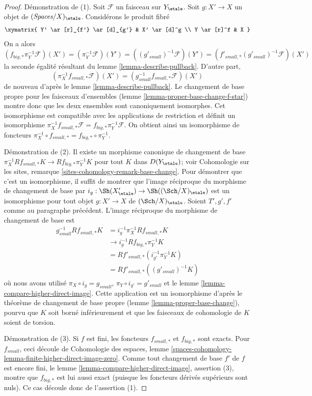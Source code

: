 \begin{proof}
Démonstration de (1). Soit $\mathcal{F}$ un faisceau sur $Y_\etale$.
Soit $g : X' \to X$ un objet de $(\textit{Spaces}/X)_\etale$.
Considérons le produit fibré
$$
\xymatrix{
Y' \ar[r]_{f'} \ar[d]_{g'} & X' \ar[d]^g \\
Y \ar[r]^f & X
}
$$
On a alors
$$
(f_{big, *}\pi_Y^{-1}\mathcal{F})(X') =
(\pi_Y^{-1}\mathcal{F})(Y') =
((g'_{small})^{-1}\mathcal{F})(Y')  =
(f'_{small, *}(g'_{small})^{-1}\mathcal{F})(X')
$$
la seconde égalité résultant du lemme \ref{lemma-describe-pullback}.
D'autre part,
$$
(\pi_X^{-1}f_{small, *}\mathcal{F})(X') =
(g_{small}^{-1}f_{small, *}\mathcal{F})(X')
$$
de nouveau d'après le lemme \ref{lemma-describe-pullback}.
Le changement de base propre pour les faisceaux d'ensembles
(lemme \ref{lemma-proper-base-change-f-star}) montre donc que les deux
ensembles sont canoniquement isomorphes. Cet isomorphisme est compatible
avec les applications de restriction et définit un isomorphisme
$\pi_X^{-1}f_{small, *}\mathcal{F} = f_{big, *}\pi_Y^{-1}\mathcal{F}$.
On obtient ainsi un isomorphisme de foncteurs
$\pi_X^{-1} \circ f_{small, *} = f_{big, *} \circ \pi_Y^{-1}$.

\medskip\noindent
Démonstration de (2). Il existe un morphisme canonique de changement de base
$\pi_X^{-1}Rf_{small, *}K \to Rf_{big, *}\pi_Y^{-1}K$
pour tout $K$ dans $D(Y_\etale)$; voir Cohomologie sur les sites, remarque
\ref{sites-cohomology-remark-base-change}.
Pour démontrer que c'est un isomorphisme, il suffit de montrer que l'image
réciproque du morphisme de changement de base par
$i_g : \Sh(X'_\etale) \to \Sh((\Sch/X)_\etale)$ est un isomorphisme pour tout
objet $g : X' \to X$ de $(\Sch/X)_\etale$.
Soient $T', g', f'$ comme au paragraphe précédent.
L'image réciproque du morphisme de changement de base est
\begin{align*}
g_{small}^{-1}Rf_{small, *}K
& =
i_g^{-1}\pi_X^{-1}Rf_{small, *}K \\
& \to
i_g^{-1}Rf_{big, *}\pi_Y^{-1}K \\
& =
Rf'_{small, *}(i_{g'}^{-1}\pi_Y^{-1}K) \\
& =
Rf'_{small, *}((g'_{small})^{-1}K)
\end{align*}
où nous avons utilisé $\pi_X \circ i_g = g_{small}$,
$\pi_Y \circ i_{g'} = g'_{small}$ et le lemme
\ref{lemma-compare-higher-direct-image}.
Cette application est un isomorphisme d'après le théorème de changement de base
propre (lemme \ref{lemma-proper-base-change}), pourvu que $K$ soit borné
inférieurement et que les faisceaux de cohomologie de $K$ soient de torsion.

\medskip\noindent
Démonstration de (3). Si $f$ est fini, les foncteurs
$f_{small, *}$ et $f_{big, *}$ sont exacts. Pour $f_{small}$, ceci découle de
Cohomologie des espaces, lemme
\ref{spaces-cohomology-lemma-finite-higher-direct-image-zero}.
Comme tout changement de base $f'$ de $f$ est encore fini, le lemme
\ref{lemma-compare-higher-direct-image}, assertion (3), montre que
$f_{big, *}$ est lui aussi exact (puisque les foncteurs dérivés supérieurs
sont nuls). Ce cas découle donc de l'assertion (1).
\end{proof}
